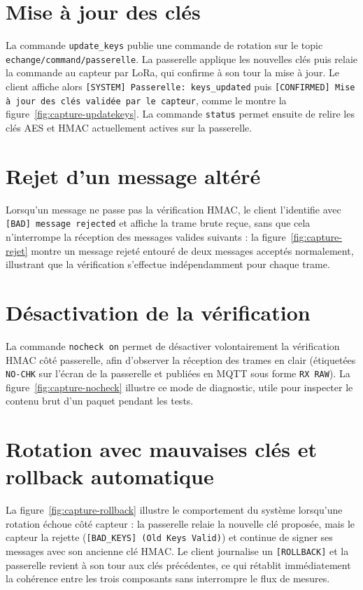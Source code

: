 \documentclass[a4paper,11pt]{report}
\begin{document}
\section{Mise à jour des clés}
La commande \texttt{update\_keys} publie une commande de rotation sur le topic
\texttt{echange/command/passerelle}. La passerelle applique les nouvelles clés puis relaie la commande au
capteur par LoRa, qui confirme à son tour la mise à jour. Le client affiche alors
\texttt{[SYSTEM] Passerelle: keys\_updated} puis \texttt{[CONFIRMED] Mise à jour des clés validée par le
capteur}, comme le montre la figure~\ref{fig:capture-updatekeys}. La commande \texttt{status} permet
ensuite de relire les clés AES et HMAC actuellement actives sur la passerelle.

\section{Rejet d'un message altéré}
Lorsqu'un message ne passe pas la vérification HMAC, le client l'identifie avec
\texttt{[BAD] message rejected} et affiche la trame brute reçue, sans que cela n'interrompe la réception
des messages valides suivants : la figure~\ref{fig:capture-rejet} montre un message rejeté entouré de deux
messages acceptés normalement, illustrant que la vérification s'effectue indépendamment pour chaque trame.

\section{Désactivation de la vérification}
La commande \texttt{nocheck on} permet de désactiver volontairement la vérification HMAC côté passerelle,
afin d'observer la réception des trames en clair (étiquetées \texttt{NO-CHK} sur l'écran de la passerelle
et publiées en MQTT sous forme \texttt{RX RAW}). La figure~\ref{fig:capture-nocheck} illustre ce mode de
diagnostic, utile pour inspecter le contenu brut d'un paquet pendant les tests.

\section{Rotation avec mauvaises clés et rollback automatique}
La figure~\ref{fig:capture-rollback} illustre le comportement du système lorsqu'une rotation échoue côté
capteur : la passerelle relaie la nouvelle clé proposée, mais le capteur la rejette
(\texttt{[BAD\_KEYS] (Old Keys Valid)}) et continue de signer ses messages avec son ancienne clé HMAC. Le
client journalise un \texttt{[ROLLBACK]} et la passerelle revient à son tour aux clés précédentes, ce qui
rétablit immédiatement la cohérence entre les trois composants sans interrompre le flux de mesures.
\end{document}
